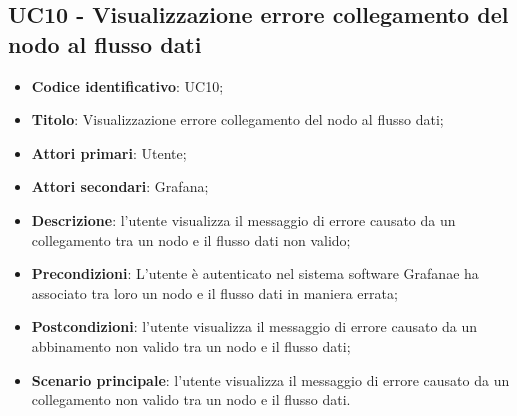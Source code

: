 \subsection{UC10 - Visualizzazione errore collegamento del nodo al flusso dati}
\begin{itemize}
    \item \textbf{Codice identificativo}: UC10;
    \item \textbf{Titolo}: Visualizzazione errore collegamento del nodo al flusso dati;
    \item \textbf{Attori primari}: Utente;
    \item \textbf{Attori secondari}: Grafana\glo;
    \item \textbf{Descrizione}: l'utente visualizza il messaggio di errore causato da un collegamento tra un nodo e il flusso dati non valido;
    \item \textbf{Precondizioni}: L'utente è autenticato nel sistema software Grafana\glosp e ha associato tra loro un nodo e il flusso dati in maniera errata;
    \item \textbf{Postcondizioni}: l'utente visualizza il messaggio di errore causato da un abbinamento non valido tra un nodo e il flusso dati;
    \item \textbf{Scenario principale}: l'utente visualizza il messaggio di errore causato da un collegamento non valido tra un nodo e il flusso dati.
\end{itemize}